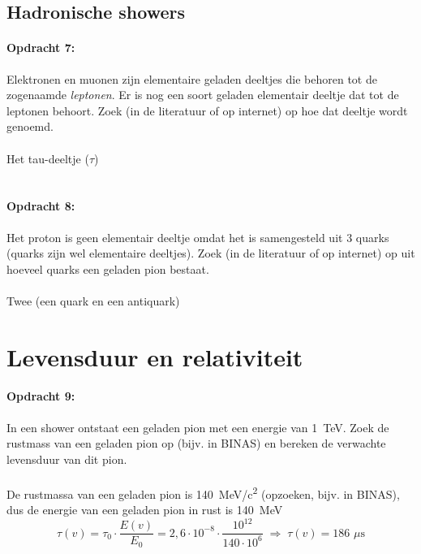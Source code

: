 \subsection{Hadronische showers}

\begin{minipage}[t]{1\columnwidth}
\paragraph{Opdracht 7:}
Elektronen en muonen zijn elementaire geladen deeltjes die behoren tot
de zogenaamde \emph{leptonen}. Er is nog een soort geladen elementair
deeltje dat tot de leptonen behoort. Zoek (in de literatuur of op
internet) op hoe dat deeltje wordt genoemd.
\\ \\  
Het tau-deeltje ($\tau$)
\\ \\
\end{minipage}

\begin{minipage}[t]{1\columnwidth}
\paragraph{Opdracht 8:}
Het proton is geen elementair deeltje omdat het is samengesteld uit 3
quarks (quarks zijn wel elementaire deeltjes). Zoek (in de literatuur of
op internet) op uit hoeveel quarks een geladen pion bestaat.  
\\ \\
Twee (een quark en een antiquark)
\end{minipage}
\smallskip{}

\section{Levensduur en relativiteit}

\begin{minipage}[t]{1\columnwidth}
\paragraph{Opdracht 9:}
In een shower ontstaat een geladen pion met een energie van
\SI{1}{\tera\electronvolt}. Zoek de rustmass van een geladen pion op
(bijv. in BINAS) en bereken de verwachte levensduur van dit pion.
\\ \\
De rustmassa van een geladen pion is \SI{140}{\mega\electronvolt/c^2}
(opzoeken, bijv. in BINAS), dus de energie van een geladen pion in rust
is \SI{140}{\mega\electronvolt}
\begin{equation}
\tau (v) = \tau_0 \cdot \frac{E(v)}{E_0}
= 2,6 \cdot 10^{-8} \cdot \frac{10^{12}}{140 \cdot 10^6}
\;\Rightarrow\; \tau (v) = 186 \,\, \mu \textrm{s} \nonumber
\end{equation}
\end{minipage}
\smallskip{}

